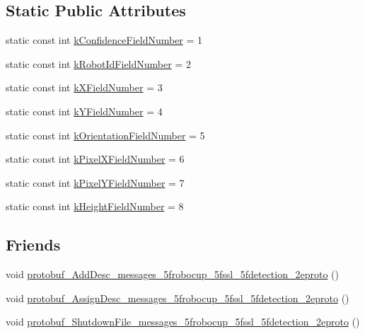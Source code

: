 \subsection*{Static Public Attributes}
\begin{DoxyCompactItemize}
\item 
static const int \hyperlink{class_s_s_l___detection_robot_ac3d0b3650d88df0500e69c017ae14dfa}{k\-Confidence\-Field\-Number} = 1
\item 
static const int \hyperlink{class_s_s_l___detection_robot_ae1a42bf4a88493ababf16b243e07e2a4}{k\-Robot\-Id\-Field\-Number} = 2
\item 
static const int \hyperlink{class_s_s_l___detection_robot_a3182311ef402856c22fe1ffc48735964}{k\-X\-Field\-Number} = 3
\item 
static const int \hyperlink{class_s_s_l___detection_robot_a2d3a7be47543adcab212766d4ea5d048}{k\-Y\-Field\-Number} = 4
\item 
static const int \hyperlink{class_s_s_l___detection_robot_a3d662f25bc8aff2e730ca1240c94c4d7}{k\-Orientation\-Field\-Number} = 5
\item 
static const int \hyperlink{class_s_s_l___detection_robot_a3e9499f6410861753fe4adea7c34d00d}{k\-Pixel\-X\-Field\-Number} = 6
\item 
static const int \hyperlink{class_s_s_l___detection_robot_a9521e09ccb54beeca996e8cdc6af8017}{k\-Pixel\-Y\-Field\-Number} = 7
\item 
static const int \hyperlink{class_s_s_l___detection_robot_a16044f64c6ef687ccc7e8dcd2c6b2a29}{k\-Height\-Field\-Number} = 8
\end{DoxyCompactItemize}
\subsection*{Friends}
\begin{DoxyCompactItemize}
\item 
void \hyperlink{class_s_s_l___detection_robot_a238ecf23556fbaa6d77409838dbb8e59}{protobuf\-\_\-\-Add\-Desc\-\_\-messages\-\_\-5frobocup\-\_\-5fssl\-\_\-5fdetection\-\_\-2eproto} ()
\item 
void \hyperlink{class_s_s_l___detection_robot_a8c97dea58197fa3da2e50d8a912299bd}{protobuf\-\_\-\-Assign\-Desc\-\_\-messages\-\_\-5frobocup\-\_\-5fssl\-\_\-5fdetection\-\_\-2eproto} ()
\item 
void \hyperlink{class_s_s_l___detection_robot_a2e69f2df742d8d46e426bbf86248ca01}{protobuf\-\_\-\-Shutdown\-File\-\_\-messages\-\_\-5frobocup\-\_\-5fssl\-\_\-5fdetection\-\_\-2eproto} ()
\end{DoxyCompactItemize}


